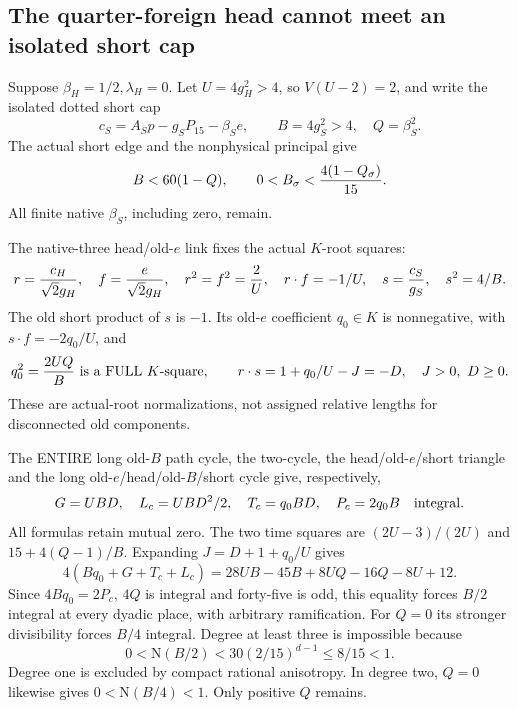 \subsection{The quarter-foreign head cannot meet an isolated short cap}
\label{app:arithB15Iquarter}

Suppose \(\beta_H=1/2,\lambda_H=0\).
Let \(U=4g_H^2>4\), so \(V(U-2)=2\), and write the
isolated dotted short cap
\[
 c_S=A_Sp-g_SP_{15}-\beta_Se,\qquad
 B=4g_S^2>4,\quad Q=\beta_S^2.
\]
The actual short edge and the nonphysical principal give
\[
 B<60(1-Q),\qquad
 0<B_\sigma<{4(1-Q_\sigma)\over15}.
\]
All finite native \(\beta_S\), including zero, remain.

The native-three head/old-\(e\) link fixes the actual
\(K\)-root squares:
\[
 r={c_H\over\sqrt2g_H},\quad f={e\over\sqrt2g_H},
 \quad r^2=f^2={2\over U},\quad r\cdot f=-1/U,\quad
 s={c_S\over g_S},\quad s^2=4/B .
\]
The old short product of \(s\) is \(-1\).
Its old-\(e\) coefficient \(q_0\in K\) is nonnegative,
with \(s\cdot f=-2q_0/U\), and
\[
 q_0^2={2UQ\over B}\text{ is a FULL }K\text{-square},\qquad
 r\cdot s=1+q_0/U-J=-D,\quad J>0,\ D\ge0 .
\]
These are actual-root normalizations, not assigned
relative lengths for disconnected old components.

The ENTIRE long old-\(B\) path cycle, the two-cycle,
the head/old-\(e\)/short triangle and the long
old-\(e\)/head/old-\(B\)/short cycle give, respectively,
\[
              G=UBD,\quad L_c=UBD^2/2,\quad
              T_c=q_0BD,\quad P_c=2q_0B
                         \quad\hbox{integral}.
\]
All formulas retain mutual zero.
The two time squares are
\((2U-3)/(2U)\) and \(15+4(Q-1)/B\).
Expanding \(J=D+1+q_0/U\) gives
\[
 4(Bq_0+G+T_c+L_c)
       =28UB-45B+8UQ-16Q-8U+12 .
\tag{BQ2}\label{eq:arithB15Iquarterparity}
\]
Since \(4Bq_0=2P_c\), \(4Q\) is integral and
forty-five is odd, this equality forces \(B/2\)
integral at every dyadic place, with arbitrary
ramification.
For \(Q=0\) its stronger divisibility forces \(B/4\)
integral.
Degree at least three is impossible because
\[
                 0<\mathrm N(B/2)
                       <30(2/15)^{d-1}\le8/15<1 .
\]
Degree one is excluded by compact rational anisotropy.
In degree two, \(Q=0\) likewise gives
\(0<\mathrm N(B/4)<1\).
Only positive \(Q\) remains.

